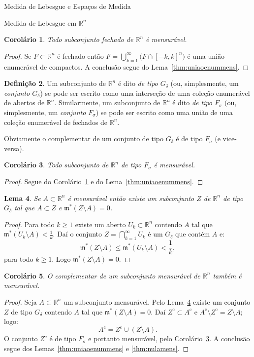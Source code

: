 \documentclass[oneside,final,11pt]{amsbook}
\newcommand{\R}{\mathds R}
\newcommand{\leb}{\mathfrak m}
\newcommand{\compl}{\mathrm c}
\theoremstyle{remark}\newtheorem{exercise}{Exercício}[chapter]
\theoremstyle{remark}\newtheorem{*exercise}[exercise]{\hbox to 0pt{\hskip 0pt minus 1fil*}Exercício}
\theoremstyle{definition}\newtheorem{exdefin}{Definição}[chapter]
\theoremstyle{plain}\newtheorem{teo}{Teorema}[section]
\theoremstyle{plain}\newtheorem{lem}[teo]{Lema}
\theoremstyle{plain}\newtheorem{prop}[teo]{Proposição}
\theoremstyle{plain}\newtheorem{cor}[teo]{Corolário}
\theoremstyle{definition}\newtheorem{defin}[teo]{Definição}
\theoremstyle{remark}\newtheorem{rem}[teo]{Observação}
\theoremstyle{definition}\newtheorem{notation}[teo]{Notação}
\theoremstyle{definition}\newtheorem{convention}[teo]{Convenção}
\theoremstyle{definition}\newtheorem{example}[teo]{Exemplo}
\numberwithin{section}{chapter}
\numberwithin{equation}{section}
\begin{document}
\begin{chapter}{Medida de Lebesgue e Espaços de Medida}
\begin{section}[Medida de Lebesgue em $\R^n$]{Medida de Lebesgue em ${\R^n}$}
\begin{cor}\label{thm:fechadomens}
Todo subconjunto fechado de $\R^n$ é mensurável.
\end{cor}
\begin{proof}
Se $F\subset\R^n$ é fechado então $F=\bigcup_{k=1}^\infty\big(F\cap[-k,k]^n\big)$ é uma união
enumerável de compactos. A conclusão segue do Lema~\ref{thm:uniaoenummens}.
\end{proof}

\begin{defin}
Um subconjunto de $\R^n$ é dito {\em de tipo $G_\delta$\/}
(ou, simplesmente, um {\em conjunto $G_\delta$})
se pode ser escrito como uma interseção de uma coleção enumerável de abertos de $\R^n$. Similarmente,
um subconjunto de $\R^n$ é dito {\em de tipo $F_\sigma$\/}
(ou, simplesmente, um {\em conjunto $F_\sigma$})
se pode ser escrito como uma união de uma coleção enumerável de fechados de $\R^n$.
\end{defin}
Obviamente o complementar de um conjunto de tipo $G_\delta$ é de tipo $F_\sigma$ (e vice-versa).

\begin{cor}\label{thm:Fsigmamens}
Todo subconjunto de $\R^n$ de tipo $F_\sigma$ é mensurável.
\end{cor}
\begin{proof}
Segue do Corolário~\ref{thm:fechadomens} e do Lema~\ref{thm:uniaoenummens}.
\end{proof}

\begin{lem}\label{thm:Gdeltazero}
Se $A\subset\R^n$ é mensurável então existe um subconjunto $Z$ de $\R^n$ de tipo $G_\delta$
tal que $A\subset Z$ e $\leb^*(Z\setminus A)=0$.
\end{lem}
\begin{proof}
Para todo $k\ge1$ existe um aberto $U_k\subset\R^n$ contendo $A$ tal que $\leb^*(U_k\setminus A)<\frac1k$.
Daí o conjunto $Z=\bigcap_{k=1}^\infty U_k$ é um $G_\delta$ que contém $A$ e:
\[\leb^*(Z\setminus A)\le\leb^*(U_k\setminus A)<\frac1k,\]
para todo $k\ge1$. Logo $\leb^*(Z\setminus A)=0$.
\end{proof}

\begin{cor}\label{thm:complmens}
O complementar de um subconjunto mensurável de $\R^n$ também é mensurável.
\end{cor}
\begin{proof}
Seja $A\subset\R^n$ um subconjunto mensurável. Pelo Lema~\ref{thm:Gdeltazero} existe um conjunto
$Z$ de tipo $G_\delta$ contendo $A$ tal que $\leb^*(Z\setminus A)=0$. Daí $Z^\compl\subset A^\compl$
e $A^\compl\setminus Z^\compl=Z\setminus A$; logo:
\[A^\compl=Z^\compl\cup(Z\setminus A).\]
O conjunto $Z^\compl$ é de tipo $F_\sigma$ e portanto mensurável, pelo Corolário~\ref{thm:Fsigmamens}.
A conclusão segue dos Lemas~\ref{thm:uniaoenummens} e \ref{thm:nulamens}.
\end{proof}


\end{section}
\end{chapter}
\end{document}
